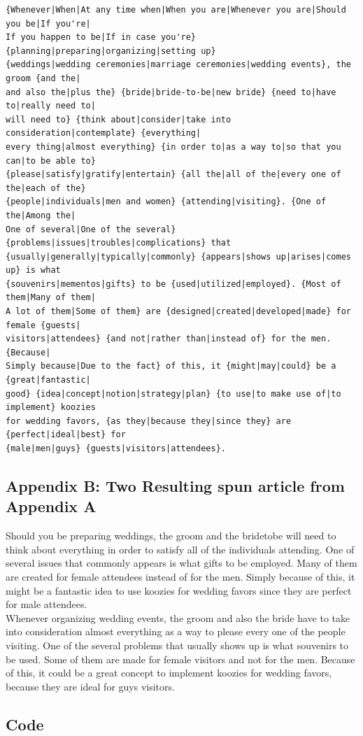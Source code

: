 \documentclass[11pt,letterpaper,oneside, titlepage]{scrartcl}
\begin{document}
\begin{verbatim}{Whenever|When|At any time when|When you are|Whenever you are|Should you be|If you're|
If you happen to be|If in case you're} {planning|preparing|organizing|setting up} 
{weddings|wedding ceremonies|marriage ceremonies|wedding events}, the groom {and the|
and also the|plus the} {bride|bride-to-be|new bride} {need to|have to|really need to|
will need to} {think about|consider|take into consideration|contemplate} {everything|
every thing|almost everything} {in order to|as a way to|so that you can|to be able to}
{please|satisfy|gratify|entertain} {all the|all of the|every one of the|each of the}
{people|individuals|men and women} {attending|visiting}. {One of the|Among the|
One of several|One of the several} {problems|issues|troubles|complications} that 
{usually|generally|typically|commonly} {appears|shows up|arises|comes up} is what 
{souvenirs|mementos|gifts} to be {used|utilized|employed}. {Most of them|Many of them|
A lot of them|Some of them} are {designed|created|developed|made} for female {guests|
visitors|attendees} {and not|rather than|instead of} for the men. {Because|
Simply because|Due to the fact} of this, it {might|may|could} be a {great|fantastic|
good} {idea|concept|notion|strategy|plan} {to use|to make use of|to implement} koozies
for wedding favors, {as they|because they|since they} are {perfect|ideal|best} for 
{male|men|guys} {guests|visitors|attendees}.
\end{verbatim}
 
\subsection{Appendix B: Two Resulting spun article from Appendix A}


Should you be preparing weddings, the groom and the bridetobe will need to think about everything in order to satisfy all of the individuals attending. One of several issues that commonly appears is what gifts to be employed. Many of them are created for female attendees instead of for the men. Simply because of this, it might be a fantastic idea to use koozies for wedding favors since they are perfect for male attendees.
\\

Whenever organizing wedding events, the groom and also the bride have to take into consideration almost everything as a way to please every one of the people visiting. One of the several problems that usually shows up is what souvenirs to be used. Some of them are made for female visitors and not for the men. Because of this, it could be a great concept to implement koozies for wedding favors, because they are ideal for guys visitors.




\clearpage

\subsection{Code}

\begin{lstlisting}

\end{lstlisting}
\end{document}
